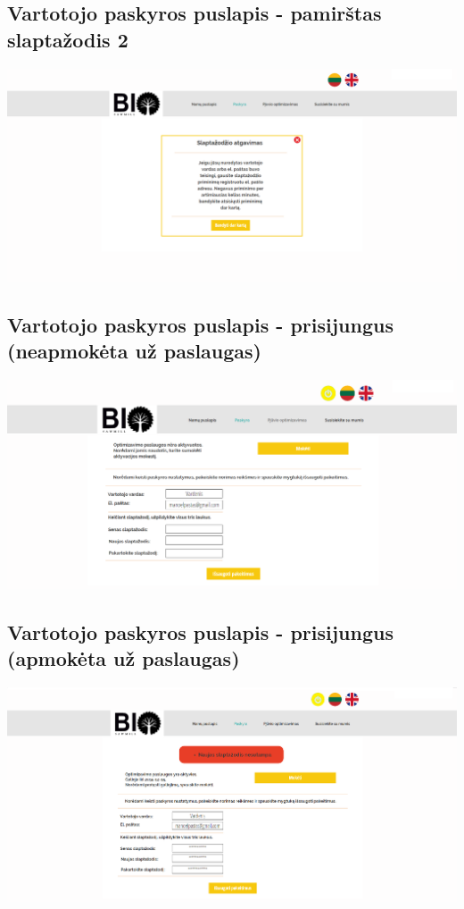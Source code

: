 \documentclass[a4paper,12pt]{article}
\begin{document}
\subsection{Vartotojo paskyros puslapis - pamirštas slaptažodis 2}
\hspace{-2cm}
\includegraphics[scale=0.5]{interfeisai/paskyrosPuslapisPamirstasSlaptazodis2}

\subsection{Vartotojo paskyros puslapis - prisijungus (neapmokėta už paslaugas)}
\hspace{-2cm}
\includegraphics[scale=0.5]{interfeisai/paskyrosPuslapisVartotojasNeapmoketas}

\subsection{Vartotojo paskyros puslapis - prisijungus (apmokėta už paslaugas)}
\hspace{-2cm}
\includegraphics[scale=0.5]{interfeisai/paskyrosPuslapisVartotojasApmoketas}
\end{document}

